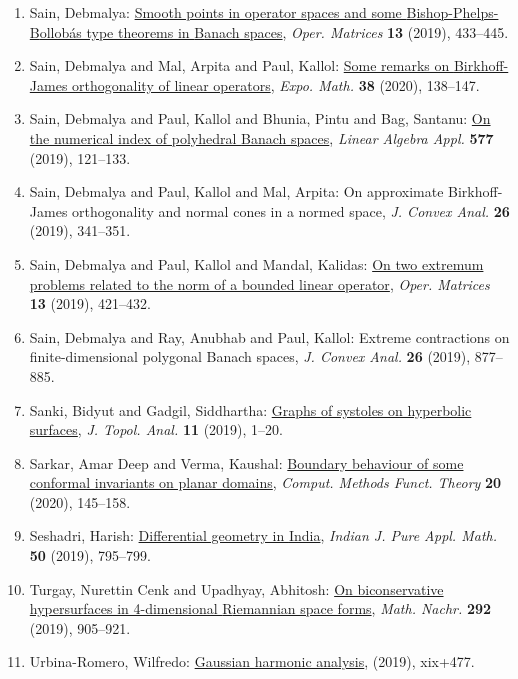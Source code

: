 \begin{enumerate}
{semi-inner-products in normed spaces}, \emph{Indian J. Pure Appl. Math.} {\bf 51} (2020), 179--186.
\item Sain, Debmalya: \href{https://doi.org/10.7153/oam-2019-13-32}{Smooth points in operator spaces and some
{B}ishop-{P}helps-{B}ollob\'{a}s type theorems in {B}anach spaces}, \emph{Oper. Matrices} {\bf 13} (2019), 433--445.
\item Sain, Debmalya and Mal, Arpita and Paul, Kallol: \href{https://doi.org/10.1016/j.exmath.2019.01.001}{Some remarks on {B}irkhoff-{J}ames orthogonality of linear
operators}, \emph{Expo. Math.} {\bf 38} (2020), 138--147.
\item Sain, Debmalya and Paul, Kallol and Bhunia, Pintu and Bag,
Santanu: \href{https://doi.org/10.1016/j.laa.2019.04.024}{On the numerical index of polyhedral {B}anach spaces}, \emph{Linear Algebra Appl.} {\bf 577} (2019), 121--133.
\item Sain, Debmalya and Paul, Kallol and Mal, Arpita: On approximate {B}irkhoff-{J}ames orthogonality and normal
cones in a normed space, \emph{J. Convex Anal.} {\bf 26} (2019), 341--351.
\item Sain, Debmalya and Paul, Kallol and Mandal, Kalidas: \href{https://doi.org/10.7153/oam-2019-13-31}{On two extremum problems related to the norm of a bounded
linear operator}, \emph{Oper. Matrices} {\bf 13} (2019), 421--432.
\item Sain, Debmalya and Ray, Anubhab and Paul, Kallol: Extreme contractions on finite-dimensional polygonal {B}anach
spaces, \emph{J. Convex Anal.} {\bf 26} (2019), 877--885.
\item Sanki, Bidyut and Gadgil, Siddhartha: \href{https://doi.org/10.1142/S1793525319500018}{Graphs of systoles on hyperbolic surfaces}, \emph{J. Topol. Anal.} {\bf 11} (2019), 1--20.
\item Sarkar, Amar Deep and Verma, Kaushal: \href{https://doi.org/10.1007/s40315-020-00303-2}{Boundary behaviour of some conformal invariants on planar
domains}, \emph{Comput. Methods Funct. Theory} {\bf 20} (2020), 145--158.
\item Seshadri, Harish: \href{https://doi.org/10.1007/s13226-019-0355-2}{Differential geometry in {I}ndia}, \emph{Indian J. Pure Appl. Math.} {\bf 50} (2019), 795--799.
\item Turgay, Nurettin Cenk and Upadhyay, Abhitosh: \href{https://doi.org/10.1002/mana.201700328}{On biconservative hypersurfaces in 4-dimensional {R}iemannian
space forms}, \emph{Math. Nachr.} {\bf 292} (2019), 905--921.
\item Urbina-Romero, Wilfredo: \href{https://doi.org/10.1007/978-3-030-05597-4}{Gaussian harmonic analysis}, \emph{} {\bf } (2019), xix+477.

\end{enumerate}
